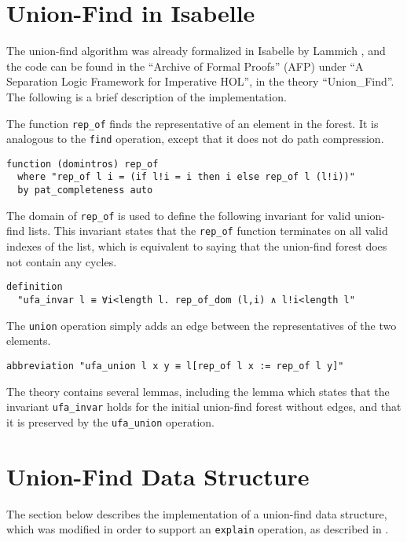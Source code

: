 \section{Union-Find in Isabelle}
\label{section:uf-isabelle}

The union-find algorithm was already formalized in Isabelle by Lammich \cite{unionfind-isabelle}, and the code can be found in the ``Archive of Formal Proofs'' (AFP) under ``A Separation Logic Framework for Imperative HOL'', in the theory ``Union\_Find''\cite{afp, Sep}. The following is a brief description of the implementation.

The function \lstinline{rep_of} finds the representative of an element in the forest. It is analogous to the \lstinline{find} operation, except that it does not do path compression.

\begin{lstlisting}
function (domintros) rep_of
  where "rep_of l i = (if l!i = i then i else rep_of l (l!i))"
  by pat_completeness auto
\end{lstlisting}

The domain of \lstinline{rep_of} is used to define the following invariant for valid union-find lists. This invariant states that the \lstinline{rep_of} function terminates on all valid indexes of the list, which is equivalent to saying that the union-find forest does not contain any cycles.

\begin{lstlisting}
definition
  "ufa_invar l ≡ ∀i<length l. rep_of_dom (l,i) ∧ l!i<length l"
\end{lstlisting}

The \lstinline{union} operation simply adds an edge between the representatives of the two elements.

\begin{lstlisting}
abbreviation "ufa_union l x y ≡ l[rep_of l x := rep_of l y]"
\end{lstlisting}

The theory contains several lemmas, including the lemma which states that the invariant \lstinline{ufa_invar} holds for the initial union-find forest without edges, and that it is preserved by the \lstinline{ufa_union} operation.

\section{Union-Find Data Structure}
\label{section:uf-data}

The section below describes the implementation of a union-find data structure, which was modified in order to support an \lstinline{explain} operation, as described in \cite{Nieuwenhuis}.

